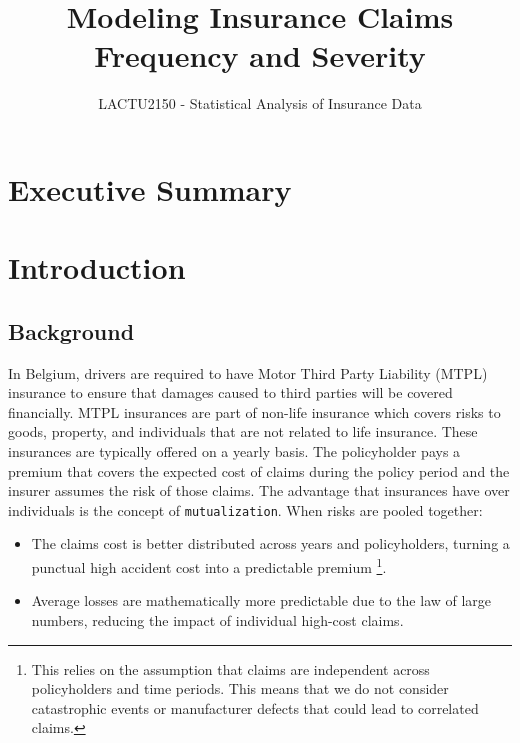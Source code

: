 \documentclass[
  english,
  11pt,
]{article}
\title{Modeling Insurance Claims Frequency and Severity}
\author{LACTU2150 - Statistical Analysis of Insurance Data}
\date{}
\providecommand{\tightlist}{%
  \setlength{\itemsep}{0pt}\setlength{\parskip}{0pt}}
\begin{document}
\maketitle

{
\setcounter{tocdepth}{2}
\tableofcontents
}
\section{Executive Summary}\label{executive-summary}

\section{Introduction}\label{introduction}

\subsection{Background}\label{background}

In Belgium, drivers are required to have Motor Third Party Liability
(MTPL) insurance to ensure that damages caused to third parties will be
covered financially. MTPL insurances are part of non-life insurance
which covers risks to goods, property, and individuals that are not
related to life insurance. These insurances are typically offered on a
yearly basis. The policyholder pays a premium that covers the expected
cost of claims during the policy period and the insurer assumes the risk
of those claims. The advantage that insurances have over individuals is
the concept of \texttt{mutualization}. When risks are pooled together:

\begin{itemize}
\tightlist
\item
  The claims cost is better distributed across years and policyholders,
  turning a punctual high accident cost into a predictable premium
  \footnote{This relies on the assumption that claims are independent
    across policyholders and time periods. This means that we do not
    consider catastrophic events or manufacturer defects that could lead
    to correlated claims.}.
\item
  Average losses are mathematically more predictable due to the law of
  large numbers, reducing the impact of individual high-cost claims.
\end{itemize}
\end{document}

